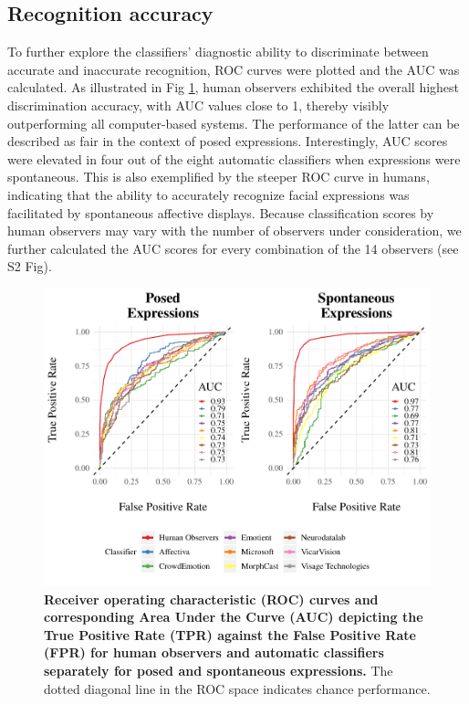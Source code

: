 \documentclass[10pt,letterpaper]{article}
\begin{document}
\hypertarget{recognition-accuracy}{%
\subsection{Recognition accuracy}\label{recognition-accuracy}}

To further explore the classifiers' diagnostic ability to discriminate between accurate and inaccurate recognition, ROC curves were plotted and the AUC was calculated. As illustrated in Fig \ref{fig:roc-curve}, human observers exhibited the overall highest discrimination accuracy, with AUC values close to 1, thereby visibly outperforming all computer-based systems. The performance of the latter can be described as fair in the context of posed expressions. Interestingly, AUC scores were elevated in four out of the eight automatic classifiers when expressions were spontaneous. This is also exemplified by the steeper ROC curve in humans, indicating that the ability to accurately recognize facial expressions was facilitated by spontaneous affective displays. Because classification scores by human observers may vary with the number of observers under consideration, we further calculated the AUC scores for every combination of the 14 observers (see S2 Fig).

\begin{figure}[!h]
\includegraphics[width=\textwidth]{manuscript_plos_au_latex_files/figure-latex/roc-curve-1} \caption{\textbf{Receiver operating characteristic (ROC) curves and corresponding Area Under the Curve (AUC) depicting the True Positive Rate (TPR) against the False Positive Rate (FPR) for human observers and automatic classifiers separately for posed and spontaneous expressions.} The dotted diagonal line in the ROC space indicates chance performance.}\label{fig:roc-curve}
\end{figure}
\end{document}
